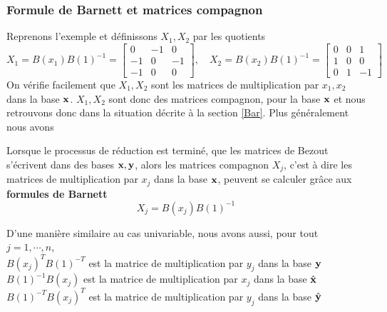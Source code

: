 \documentclass{standalone}
\begin{document}
  \subsubsection{Formule de Barnett et matrices compagnon}
  Reprenons l'exemple \label{ex_bez_multi} et définissons $X_1, X_2$ par les quotients
  \begin{equation}
  	X_1 = B(x_1)B(1)^{-1} =
  	\begin{bmatrix}
  		0 & -1 & 0\\
  		-1 & 0 & -1\\
  		-1 & 0 & 0
  	\end{bmatrix},\quad
  	X_2 = B(x_2)B(1)^{-1} =
  	\begin{bmatrix}
  		0 & 0 & 1\\
  		1 & 0 & 0\\
  		0 & 1 & -1
  	\end{bmatrix}
  \end{equation}
  On vérifie facilement que $X_1, X_2$ sont les matrices de multiplication par $x_1, x_2$ dans la base $\bold{x}$. $X_1, X_2$ sont donc des matrices compagnon, pour la base $\bold{x}$ et nous retrouvons donc dans la situation décrite à la section \ref{Bar}. Plus généralement nous avons
  \begin{prop}
  \label{Barnett_multi}
  Lorsque le processus de réduction est terminé, que les matrices de Bezout s'écrivent dans des bases $\bold{x, y}$, alors les matrices compagnon $X_j$, c'est à dire les matrices de multiplication par $x_j$ dans la base $\bold{x}$, peuvent se calculer grâce aux {\bf formules de Barnett}
  \begin{equation}
  	X_j = B(x_j)B(1)^{-1}
  \end{equation}
  \end{prop}

  \begin{rem}
  D'une manière similaire au cas univariable, nous avons aussi, pour tout $j=1,\cdots,n$,\\
  $B(x_j)^{T}B(1)^{-T}$ est la matrice de multiplication par $y_j$ dans la base $\bold{y}$ \\
  $B(1)^{-1}B(x_j)$ est la matrice de multiplication par $x_j$ dans la base $\hat{\bold{x}}$ \\
  $B(1)^{-T}B(x_j)^{T}$ est la matrice de multiplication par $y_j$ dans la base $\hat{\bold{y}}$
  \end{rem}
\end{document}
